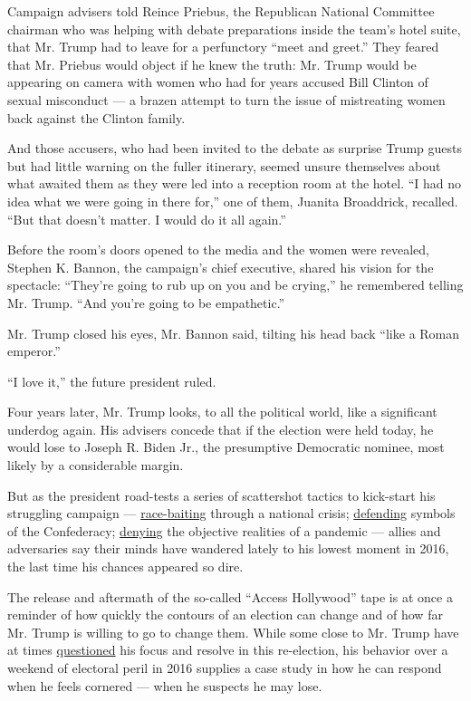 Campaign advisers told Reince Priebus, the Republican National Committee
chairman who was helping with debate preparations inside the team's
hotel suite, that Mr. Trump had to leave for a perfunctory ``meet and
greet.'' They feared that Mr. Priebus would object if he knew the truth:
Mr. Trump would be appearing on camera with women who had for years
accused Bill Clinton of sexual misconduct --- a brazen attempt to turn
the issue of mistreating women back against the Clinton family.

And those accusers, who had been invited to the debate as surprise Trump
guests but had little warning on the fuller itinerary, seemed unsure
themselves about what awaited them as they were led into a reception
room at the hotel. ``I had no idea what we were going in there for,''
one of them, Juanita Broaddrick, recalled. ``But that doesn't matter. I
would do it all again.''

Before the room's doors opened to the media and the women were revealed,
Stephen K. Bannon, the campaign's chief executive, shared his vision for
the spectacle: ``They're going to rub up on you and be crying,'' he
remembered telling Mr. Trump. ``And you're going to be empathetic.''

Mr. Trump closed his eyes, Mr. Bannon said, tilting his head back ``like
a Roman emperor.''

``I love it,'' the future president ruled.

Four years later, Mr. Trump looks, to all the political world, like a
significant underdog again. His advisers concede that if the election
were held today, he would lose to Joseph R. Biden Jr., the presumptive
Democratic nominee, most likely by a considerable margin.

But as the president road-tests a series of scattershot tactics to
kick-start his struggling campaign ---
\href{https://www.nytimes.com/2020/06/11/us/politics/trump-on-race.html}{race-baiting}
through a national crisis;
\href{https://www.nytimes.com/2020/07/06/us/politics/trump-bubba-wallace-nascar.html}{defending}
symbols of the Confederacy;
\href{https://www.nytimes.com/2020/06/21/health/coronavirus-pandemic-spread-trump.html}{denying}
the objective realities of a pandemic --- allies and adversaries say
their minds have wandered lately to his lowest moment in 2016, the last
time his chances appeared so dire.

The release and aftermath of the so-called ``Access Hollywood'' tape is
at once a reminder of how quickly the contours of an election can change
and of how far Mr. Trump is willing to go to change them. While some
close to Mr. Trump have at times
\href{https://www.nytimes.com/2020/06/17/us/politics/trump-2020-election.html}{questioned}
his focus and resolve in this re-election, his behavior over a weekend
of electoral peril in 2016 supplies a case study in how he can respond
when he feels cornered --- when he suspects he may lose.

